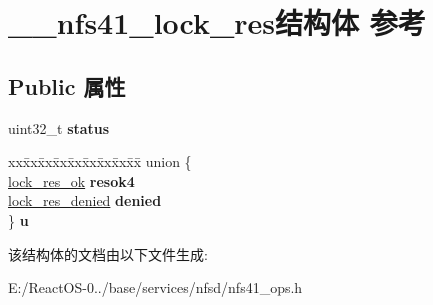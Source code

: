 \hypertarget{struct____nfs41__lock__res}{}\section{\+\_\+\+\_\+nfs41\+\_\+lock\+\_\+res结构体 参考}
\label{struct____nfs41__lock__res}
\subsection*{Public 属性}
\begin{DoxyCompactItemize}
\item 
\mbox{\label{struct____nfs41__lock__res_a686ab3bdc4db90426afea4c922d10a82}} 
uint32\+\_\+t {\bfseries status}
\item 
\mbox{\label{struct____nfs41__lock__res_ac297f3f8d908d3fec479982c3cac5bc8}} 
\begin{tabbing}
xx\=xx\=xx\=xx\=xx\=xx\=xx\=xx\=xx\=\kill
union \{\\
\>\hyperlink{struct____lock__res__ok}{lock\_res\_ok} {\bfseries resok4}\\
\>\hyperlink{struct____lock__res__denied}{lock\_res\_denied} {\bfseries denied}\\
\} {\bfseries u}\\

\end{tabbing}\end{DoxyCompactItemize}


该结构体的文档由以下文件生成\+:\begin{DoxyCompactItemize}
\item 
E\+:/\+React\+O\+S-\/0../base/services/nfsd/nfs41\+\_\+ops.\+h\end{DoxyCompactItemize}
